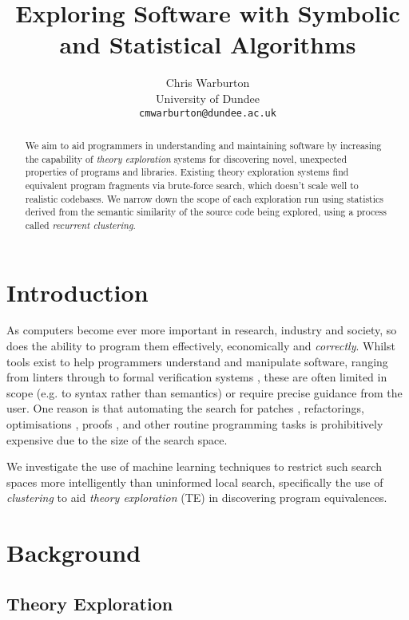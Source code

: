 \documentclass[]{default}
\title{Exploring Software with Symbolic and Statistical Algorithms}
\author{
          Chris Warburton \\
      University of Dundee \\
      \texttt{cmwarburton@dundee.ac.uk}
    }
\date{}
\begin{document}
\maketitle
\begin{abstract}
We aim to aid programmers in understanding and maintaining software
by increasing the capability of \emph{theory exploration} systems for
discovering novel, unexpected properties of programs and libraries.
Existing theory exploration systems find equivalent program fragments via brute-force
search, which doesn't scale well to realistic codebases. We narrow down
the scope of each exploration run using statistics derived from the
semantic similarity of the source code being explored, using a process
called \emph{recurrent clustering}.
\end{abstract}

\section{Introduction}\label{introduction}

As computers become ever more important in research, industry and
society, so does the ability to program them effectively, economically
and \emph{correctly}. Whilst tools exist to help programmers understand
and manipulate software, ranging from linters \cite{Johnson78lint} through to formal
verification systems \cite{boyer1983proof}, these are often limited in scope (e.g. to syntax rather than semantics) or require precise guidance from the user. One
reason is that automating the search for patches \cite{Forrest.Nguyen.Weimer.ea:2009}, refactorings,
optimisations \cite{phothilimthana2016scaling}, proofs \cite{rosen2012proving}, and other routine programming tasks is
prohibitively expensive due to the size of the search space.

We investigate the use of machine learning techniques to restrict such
search spaces more intelligently than uninformed local search,
specifically the use of \emph{clustering} to aid \emph{theory
exploration} (TE) in discovering program equivalences.

\section{Background}\label{background}

\subsection{Theory Exploration}\label{theory-exploration}
\end{document}
